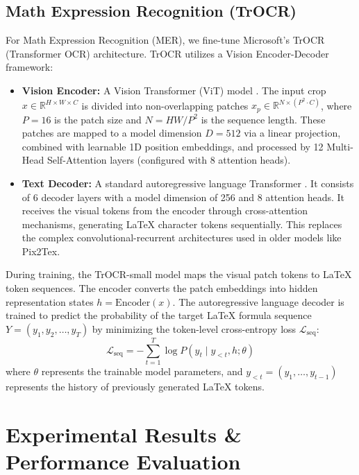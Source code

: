 \documentclass[conference]{IEEEtran}
\begin{document}
\subsection{Math Expression Recognition (TrOCR)}

For Math Expression Recognition (MER), we fine-tune Microsoft's TrOCR (Transformer OCR) architecture. TrOCR utilizes a Vision Encoder-Decoder framework:
\begin{itemize}
\item \textbf{Vision Encoder:} A Vision Transformer (ViT) model \cite{vit}. The input crop $x \in \mathbb{R}^{H \times W \times C}$ is divided into non-overlapping patches $x_p \in \mathbb{R}^{N \times (P^2 \cdot C)}$, where $P=16$ is the patch size and $N = HW/P^2$ is the sequence length. These patches are mapped to a model dimension $D = 512$ via a linear projection, combined with learnable 1D position embeddings, and processed by 12 Multi-Head Self-Attention layers (configured with 8 attention heads).
\item \textbf{Text Decoder:} A standard autoregressive language Transformer \cite{attention}. It consists of 6 decoder layers with a model dimension of 256 and 8 attention heads. It receives the visual tokens from the encoder through cross-attention mechanisms, generating LaTeX character tokens sequentially. This replaces the complex convolutional-recurrent architectures used in older models like Pix2Tex.
\end{itemize}

During training, the TrOCR-small model maps the visual patch tokens to LaTeX token sequences. The encoder converts the patch embeddings into hidden representation states $h = \text{Encoder}(x)$. The autoregressive language decoder is trained to predict the probability of the target LaTeX formula sequence $Y = (y_1, y_2, \dots, y_T)$ by minimizing the token-level cross-entropy loss $\mathcal{L}_{\text{seq}}$:
\begin{equation}
\mathcal{L}_{\text{seq}} = - \sum_{t=1}^{T} \log P\left(y_t \mid y_{<t}, h; \theta\right)
\label{eq:trocr_loss}
\end{equation}
where $\theta$ represents the trainable model parameters, and $y_{<t} = (y_1, \dots, y_{t-1})$ represents the history of previously generated LaTeX tokens.

\section{Experimental Results \& Performance Evaluation}
\label{sec:results}
\end{document}
